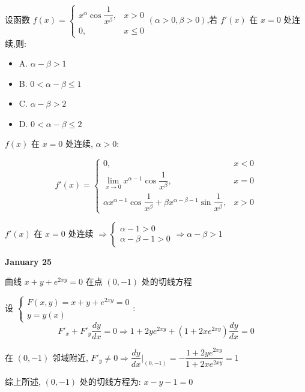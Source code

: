 \begin{example}[][Exam: 27.4.6]
	设函数 $f(x)=\begin{cases}
		x^{\alpha}\cos\dfrac{1}{x^{\beta}}, & x>0\\
		0,& x\leq 0
	\end{cases}(\alpha>0,\beta>0)$,若 $f'(x)$ 在 $x=0$ 处连续,则:
	\begin{itemize}
		\item A. $\alpha-\beta>1$
		\item B. $0<\alpha-\beta\leq 1$
		\item C. $\alpha-\beta>2$
		\item D. $0<\alpha-\beta\leq 2$
	\end{itemize}
\end{example}

\begin{solution}

	$f(x)$ 在 $x = 0$ 处连续, $\alpha > 0$:

	$$f'(x) = 
	\begin{cases}
		0, & x< 0\\
		\lim\limits_{x\to 0} x^{\alpha -1}\cos\dfrac{1}{x^{\beta}}, & x = 0\\
		\alpha x^{\alpha -1}\cos \dfrac{1}{x^{\beta}} + \beta x^{\alpha-\beta-1}\sin \dfrac{1}{x^{\beta}}, & x > 0  
	\end{cases}$$

	$f'(x)$ 在 $x = 0$ 处连续 $\Rightarrow \begin{cases} \alpha - 1 >0\\ \alpha - \beta - 1 > 0\end{cases}\Rightarrow \alpha - \beta > 1$
\end{solution}
\textcolor{purplea}{\textbf{January 25}}

\begin{example}[][Exam: 27.4.7]
	曲线 $x+y+e^{2xy}=0$ 在点 $(0,-1)$ 处的切线方程
\end{example}

\begin{solution}

	设 $\begin{cases}
		F(x,y) = x + y + e^{2xy} = 0\\
		y = y(x)
	\end{cases}$:
	$$F'_{x} + F'_{y}\dfrac{dy}{dx} = 0\Rightarrow 1+2ye^{2xy}+(1+2xe^{2xy})\dfrac{dy}{dx} =0$$

	在 $(0,-1)$ 邻域附近, $F'_{y}\neq 0\Rightarrow \dfrac{dy}{dx}\big|_{(0,-1)} = -\dfrac{1+2ye^{2xy}}{1+2xe^{2xy}} = 1$

	综上所述, $(0,-1)$ 处的切线方程为: $x - y - 1 = 0$
\end{solution}

